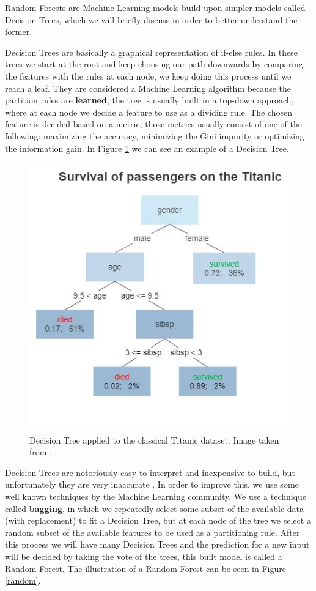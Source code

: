 Random Forests are Machine Learning models build upon simpler models called Decision Trees, which we will briefly discuss in order to better understand the former. 

Decision Trees are basically a graphical representation of if-else rules. In these trees we start at the root and keep choosing our path downwards by comparing the features with the rules at each node, we keep doing this process until we reach a leaf. They are considered a Machine Learning algorithm because the partition rules are \textbf{learned}, the tree is usually built in a top-down approach, where at each node we decide a feature to use as a dividing rule. The chosen feature is decided based on a metric, those metrics usually consist of one of the following: maximizing the accuracy, minimizing the Gini impurity or optimizing the information gain. In Figure \ref{decision} we can see an example of a Decision Tree.

\begin{figure}[H]
    \includegraphics[width=.7\textwidth]{Cap2-Methods/Decision_Tree.jpg}
    \centering
	\caption{Decision Tree applied to the classical Titanic dataset. Image taken from \cite{decisionimg}.}
	\label{decision}
\end{figure}

Decision Trees are notoriously easy to interpret and inexpensive to build, but unfortunately they are very inaccurate \cite{elements}. In order to improve this, we use some well known techniques by the Machine Learning community. We use a technique called \textbf{bagging}, in which we repeatedly select some subset of the available data (with replacement) to fit a Decision Tree, but at each node of the tree we select a random subset of the available features to be used as a partitioning rule. After this process we will have many Decision Trees and the prediction for a new input will be decided by taking the vote of the trees, this built model is called a Random Forest. The illustration of a Random Forest can be seen in Figure \ref{random}. 

